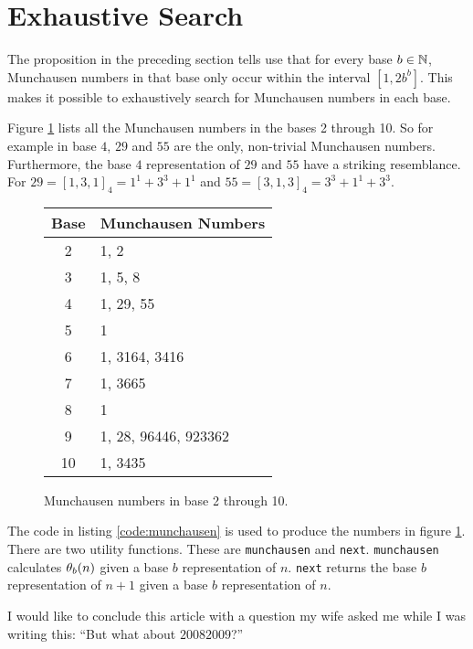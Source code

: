 \section*{Exhaustive Search}

The proposition in the preceding section tells use that for every base 
$b \in \N$, Munchausen numbers in that base only occur within the interval 
$[1,2b^{b}]$. This makes it possible to exhaustively search for Munchausen 
numbers in each base.

Figure \ref{figure:munchausen} lists all the Munchausen numbers in the bases 2
through 10. So for example in base $4$, $29$ and $55$ are the only, non-trivial
Munchausen numbers. Furthermore, the base $4$ representation of $29$ and $55$
have a striking resemblance. For $29 = [1,3,1]_{4} = 1^{1} + 3^{3} + 1^{1}$ and
$55 = [3,1,3]_{4} = 3^{3} + 1^{1} + 3^{3}$.

\begin{figure}[bh]
	\begin{center}
		\caption{Munchausen numbers in base 2 through 10.}
		\label{figure:munchausen}
		\begin{tabular}{|c|l|}
			\hline
			Base & Munchausen Numbers \\
			\hline
			2  & 1, 2 \\
			3  & 1, 5, 8 \\
			4  & 1, 29, 55 \\
			5  & 1 \\
			6  & 1, 3164, 3416 \\
			7  & 1, 3665 \\
			8  & 1 \\
			9  & 1, 28, 96446, 923362 \\
			10 & 1, 3435 \\
			\hline
		\end{tabular}
	\end{center}
\end{figure}

The code in listing \ref{code:munchausen} is used to produce the numbers in
figure \ref{figure:munchausen}. There are two utility functions. These are 
\lstinline!munchausen! and \lstinline!next!. \lstinline!munchausen! calculates 
$\P_{b}(n)$ given a base $b$ representation of $n$. \lstinline!next! returns the
base $b$ representation of $n+1$ given a base $b$ representation of $n$.

I would like to conclude this article with a question my wife asked me while I
was writing this: ``But what about $20082009$?''



